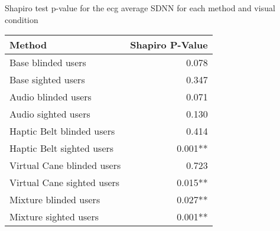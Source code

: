 
\centering
\caption{Shapiro test p-value for the ecg average SDNN for each method and visual condition}
\label{tab:shapiro_ecg_sdnn}
\begin{tabular}{lr}
\toprule
                    Method & Shapiro P-Value \\
\midrule
        Base blinded users &           0.078 \\
        Base sighted users &           0.347 \\
       Audio blinded users &           0.071 \\
       Audio sighted users &           0.130 \\
 Haptic Belt blinded users &           0.414 \\
 Haptic Belt sighted users &         0.001** \\
Virtual Cane blinded users &           0.723 \\
Virtual Cane sighted users &         0.015** \\
     Mixture blinded users &         0.027** \\
     Mixture sighted users &         0.001** \\
\bottomrule
\end{tabular}
